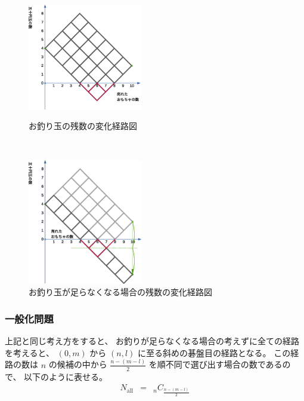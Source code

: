 \begin{figure}
  \begin{minipage}[c]{.49\linewidth}  %
  \centering
  \includegraphics[width=5cm]{S030/Figs/Figure.change.p01.eps}
  \caption{お釣り玉の残数の変化経路図}
  \label{fig:S030/Figs/Figure.change.p01}
  \end{minipage}~
  \begin{minipage}[c]{.49\linewidth}  %
  \centering
  \includegraphics[width=5cm]{S030/Figs/Figure.change.p02.eps}
  \caption{お釣り玉が足らなくなる場合の残数の変化経路図}
  \label{fig:S030/Figs/Figure.change.p02}
  \end{minipage}
\end{figure}


\subsubsection{一般化問題}
\label{sssec:お釣り:解答:一般化問題}

上記と同じ考え方をすると、
お釣りが足らなくなる場合の考えずに全ての経路を考えると、
$(0,m)$ から $(n,l)$ に至る斜めの碁盤目の経路となる。
この経路の数は
$n$ の候補の中から $\frac{n - (m-l)}{2}$ を順不同で選び出す場合の数であるので、
以下のように表せる。
  \begin{eqnarray}
    N_{\text{all}} & = & _{n}C_{\frac{n - (m-l)}{2}}
  \end{eqnarray}

